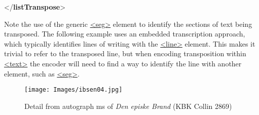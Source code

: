 \begin{shaded}
\hspace*{1em}\mbox{}\newline 
\hspace*{1em}\mbox{}\newline 
{}\mbox{}\newline 
{</\textbf{listTranspose}>}\end{shaded}\egroup\par \par
Note the use of the generic \hyperref[TEI.seg]{<seg>} element to identify the sections of text being transposed. The following example uses an embedded transcription approach, which typically identifies lines of writing with the \hyperref[TEI.line]{<line>} element. This makes it trivial to refer to the transposed line, but when encoding transposition within \hyperref[TEI.text]{<text>} the encoder will need to find a way to identify the line with another element, such as \hyperref[TEI.seg]{<seg>}.\begin{figure}[htbp]
\noindent\noindent\texttt{[image: Images/ibsen04.jpg]}
\caption{Detail from autograph ms of \textit{Den episke Brand} (KBK Collin 2869)}\end{figure}
